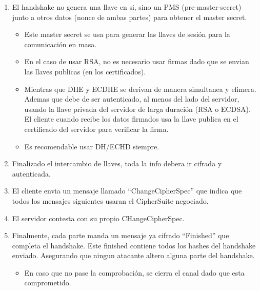 \documentclass[11pt]{article}
\begin{document}
\begin{enumerate}
\begin{enumerate}
\begin{itemize}
\item Cuando ambas partes se autentican con un certificado se le llama Mutual TLS o MTLS.
\item Para autenticar al cliente se usa mas la identidad del usuario como user-password entre otros. Esto despues de establecer una sesión segura con una llave compartida.
\end{itemize}
\item El handshake no genera una llave en si, sino un PMS (pre-master-secret) junto a otros datos (nonce de ambas partes) para obtener el master secret.
\begin{itemize}
\item Este master secret se usa para generar las llaves de sesión para la comunicación en masa.
\item En el caso de usar RSA, no es necesario usar firmas dado que se envian las llaves publicas (en los certificados).
\item Mientras que DHE y ECDHE se derivan de manera simultanea y efimera. Ademas que debe de ser autenticado, al menos del lado del servidor, usando la llave privada del servidor de larga duración (RSA o ECDSA). El cliente cuando recibe los datos firmados usa la llave publica en el certificado del servidor para verificar la firma.
\item Es recomendable usar DH/ECHD siempre.
\end{itemize}
\item Finalizado el intercambio de llaves, toda la info debera ir cifrada y autenticada.
\item El cliente envia un mensaje llamado ``ChangeCipherSpec'' que indica que todos los mensajes siguientes usaran el CipherSuite negociado.
\item El servidor contesta con su propio CHangeCipherSpec.
\item Finalmente, cada parte manda un mensaje ya cifrado ``Finished'' que completa el handshake. Este finished contiene todos los hashes del handshake enviado. Asegurando que ningun atacante altero alguna parte del handshake.
\begin{itemize}
\item En caso que no pase la comprobación, se cierra el canal dado que esta comprometido.
\end{itemize}


\end{enumerate}
\end{enumerate}
\end{document}
